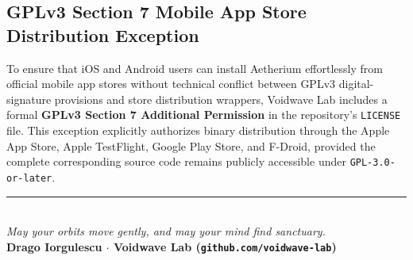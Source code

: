 \documentclass[11pt,oneside,openany]{book}
\begin{document}
\subsection*{GPLv3 Section 7 Mobile App Store Distribution Exception}
To ensure that iOS and Android users can install Aetherium effortlessly from official mobile app stores without technical conflict between GPLv3 digital-signature provisions and store distribution wrappers, Voidwave Lab includes a formal \textbf{GPLv3 Section 7 Additional Permission} in the repository's \texttt{LICENSE} file. This exception explicitly authorizes binary distribution through the Apple App Store, Apple TestFlight, Google Play Store, and F-Droid, provided the complete corresponding source code remains publicly accessible under \texttt{GPL-3.0-or-later}.

\vspace{1.5em}
\begin{center}
  {\color{AetherCyanDark}\rule{2.2in}{0.6pt}}\\[0.8em]
  {\itshape\color{SlateMuted} May your orbits move gently, and may your mind find sanctuary.}\\[0.3em]
  {\sffamily\footnotesize\bfseries\color{CosmicDeep} Drago Iorgulescu $\cdot$ Voidwave Lab (\texttt{github.com/voidwave-lab})}
\end{center}
\end{document}
